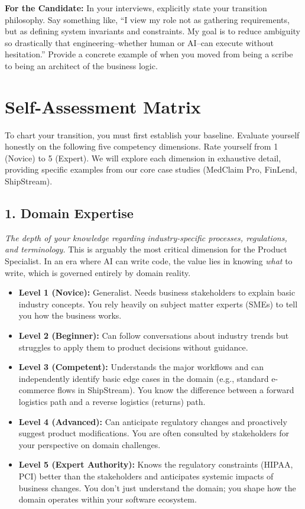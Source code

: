 \documentclass[
  11pt,
  openany,
  oneside]{book}
\providecommand{\tightlist}{%
  \setlength{\itemsep}{0pt}\setlength{\parskip}{0pt}}
\renewenvironment{quote}{\begin{customquote}}{\end{customquote}}
\begin{document}
\begin{quote}
\textbf{For the Candidate:} In your interviews, explicitly state your
transition philosophy. Say something like, ``I view my role not as
gathering requirements, but as defining system invariants and
constraints. My goal is to reduce ambiguity so drastically that
engineering--whether human or AI--can execute without hesitation.''
Provide a concrete example of when you moved from being a scribe to
being an architect of the business logic.
\end{quote}

\bigskip

\section{Self-Assessment Matrix}\label{self-assessment-matrix}

To chart your transition, you must first establish your baseline.
Evaluate yourself honestly on the following five competency dimensions.
Rate yourself from 1 (Novice) to 5 (Expert). We will explore each
dimension in exhaustive detail, providing specific examples from our
core case studies (MedClaim Pro, FinLend, ShipStream).

\subsection{1. Domain Expertise}\label{domain-expertise}

\emph{The depth of your knowledge regarding industry-specific processes,
regulations, and terminology.} This is arguably the most critical
dimension for the Product Specialist. In an era where AI can write code,
the value lies in knowing \emph{what} to write, which is governed
entirely by domain reality.

\begin{itemize}
\tightlist
\item
  \textbf{Level 1 (Novice):} Generalist. Needs business stakeholders to
  explain basic industry concepts. You rely heavily on subject matter
  experts (SMEs) to tell you how the business works.
\item
  \textbf{Level 2 (Beginner):} Can follow conversations about industry
  trends but struggles to apply them to product decisions without
  guidance.
\item
  \textbf{Level 3 (Competent):} Understands the major workflows and can
  independently identify basic edge cases in the domain (e.g., standard
  e-commerce flows in ShipStream). You know the difference between a
  forward logistics path and a reverse logistics (returns) path.
\item
  \textbf{Level 4 (Advanced):} Can anticipate regulatory changes and
  proactively suggest product modifications. You are often consulted by
  stakeholders for your perspective on domain challenges.
\item
  \textbf{Level 5 (Expert Authority):} Knows the regulatory constraints
  (HIPAA, PCI) better than the stakeholders and anticipates systemic
  impacts of business changes. You don't just understand the domain; you
  shape how the domain operates within your software ecosystem.
\end{itemize}
\end{document}
